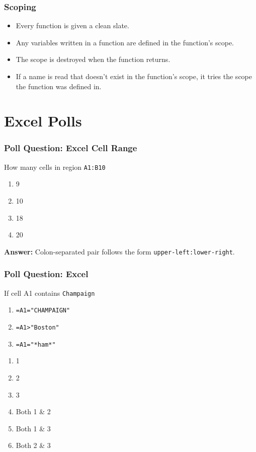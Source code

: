\documentclass{beamer}
\begin{document}
%
%
\begin{frame}[fragile]
  \frametitle{Scoping}
  \begin{itemize}
    \item Every function is given a clean slate.
    \item Any variables written in a function are defined in the function's scope.
    \item The scope is destroyed when the function returns.
    \item If a name is read that doesn't exist in the function's scope, it tries the scope the function was defined in.
  \end{itemize}
\end{frame}


\section{Excel Polls}
%
%
\begin{frame}[fragile]
  \frametitle{Poll Question: Excel Cell Range}
  How many cells in region \lstinline|A1:B10|
  \vfill
  \begin{enumerate}[A]
    \item 9
    \item 10
    \item 18
    \item 20
  \end{enumerate}
  \pause
  \textbf{Answer:} Colon-separated pair follows the form \lstinline|upper-left:lower-right|.
\end{frame}


%
%
\begin{frame}[fragile]
  \frametitle{Poll Question: Excel}
  If cell A1 contains \lstinline|Champaign|\\
  \begin{enumerate}
    \item \lstinline|=A1="CHAMPAIGN"|
    \item \lstinline|=A1>"Boston"|
    \item \lstinline|=A1="*ham*"|
  \end{enumerate}
  \vfill
  \begin{enumerate}[A]
    \item 1
    \item 2
    \item 3
    \item Both 1 \& 2
    \item Both 1 \& 3
    \item Both 2 \& 3
  \end{enumerate}
\end{frame}
\end{document}
